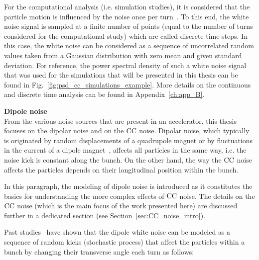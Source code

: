 For the computational analysis (i.e. simulation studies), it is considered that the particle motion is influenced by the noise once per turn~\cite{Lebedev:248620, Lebedev:248622, PhysRevSTAB.18.101001}. To this end, the white noise signal is sampled at a finite number of points (equal to the number of turns considered for the computational study) which are called discrete time steps. In this case, the white noise can be considered as a sequence of uncorrelated random values taken from a Gaussian distribution with zero mean and given standard deviation. For reference, the power spectral density of such a white noise signal that was used for the simulations that will be presented in this thesis can be found in Fig.~\ref{fig:psd_cc_simulations_example}. More details on the continuous and discrete time analysis can be found in Appendix~\ref{ch:app_B}. %

\clearpage
\textbf{Dipole noise}\\
From the various noise sources that are present in an accelerator, this thesis focuses on the dipolar noise and on the ${\mathrm{CC}}$ noise. Dipolar noise, which typically is originated by random displacements of a quadrupole magnet or by fluctuations in the current of a dipole magnet~\cite{Lebedev:248620}, affects all particles in the same way, i.e. the noise kick is constant along the bunch.
On the other hand, the way the ${\mathrm{CC}}$ noise affects the particles depends on their longitudinal position within the bunch. 

In this paragraph, the modeling of dipole noise is introduced as it constitutes the basics for understanding the more complex effects of ${\mathrm{CC}}$ noise. The details on the ${\mathrm{CC}}$ noise (which is the main focus of the work presented here) are discussed further in a dedicated section (see Section~\ref{sec:CC_noise_intro}). 

Past studies~\cite{Lebedev:248620, Lebedev:248622} have shown that the dipole white noise can be modeled as a sequence of random kicks (stochastic process) that affect the particles within a bunch by changing their transverse angle each turn as follows:

